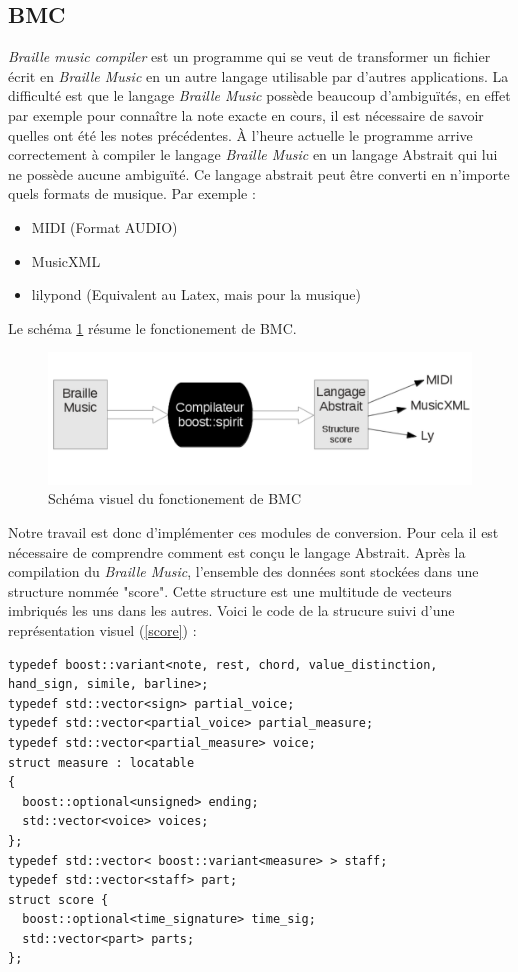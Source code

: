 \subsection{BMC}


\textit{Braille music compiler} est un programme qui se veut de
transformer un fichier écrit en \textit{Braille Music} en un autre langage
utilisable par d'autres applications. La difficulté est que le langage
\textit{Braille Music} possède beaucoup d'ambiguïtés, en effet par exemple
pour connaître la note exacte en cours, il est nécessaire de savoir
quelles ont été les notes précédentes. \`A l'heure actuelle le programme
arrive correctement à compiler le langage \textit{Braille Music} en un
langage Abstrait qui lui ne possède aucune ambiguïté. Ce langage
abstrait peut être converti en n'importe quels formats de musique. Par
exemple : 

\begin{itemize}
\item MIDI (Format AUDIO)
\item MusicXML 
\item lilypond (Equivalent au Latex, mais pour la musique)
\end{itemize}
Le schéma \ref{compiler} résume le fonctionement de BMC.

\begin{figure}[!h]
  \centering
  \includegraphics[width=1\textwidth]{images/fonction-bmc.png}
  \caption{Schéma visuel du fonctionement de BMC}
  \label{compiler}
\end{figure}

Notre travail est donc d'implémenter ces modules de conversion. Pour
cela il est nécessaire de comprendre comment est conçu le langage
Abstrait. Après la compilation du \textit{Braille Music}, l'ensemble des
données sont stockées dans une structure nommée "score". Cette
structure est une multitude de vecteurs imbriqués les uns dans les
autres. Voici le code de la strucure suivi d'une représentation visuel (\ref{score})
:

\begin{verbatim}
typedef boost::variant<note, rest, chord, value_distinction, hand_sign, simile, barline>;
typedef std::vector<sign> partial_voice;
typedef std::vector<partial_voice> partial_measure;
typedef std::vector<partial_measure> voice;
struct measure : locatable
{
  boost::optional<unsigned> ending;
  std::vector<voice> voices;
};
typedef std::vector< boost::variant<measure> > staff;
typedef std::vector<staff> part;
struct score {
  boost::optional<time_signature> time_sig;
  std::vector<part> parts;
};
\end{verbatim}

